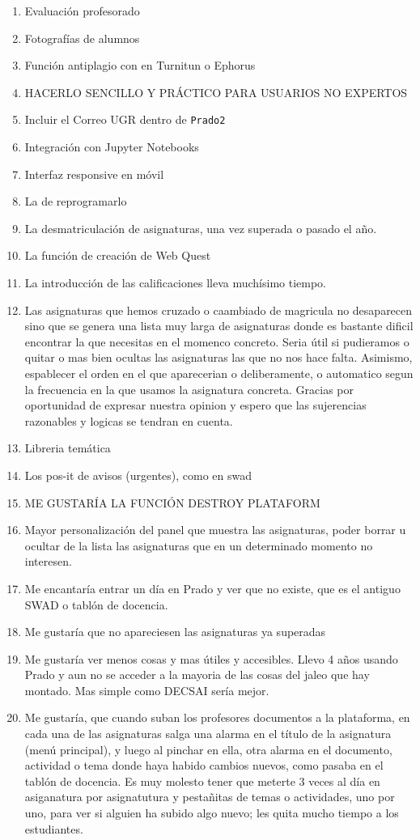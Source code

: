 \begin{enumerate}
\item Evaluación profesorado
\item Fotografías de alumnos
\item Función antiplagio con en Turnitun o Ephorus
\item HACERLO SENCILLO Y PRÁCTICO PARA USUARIOS NO EXPERTOS
\item Incluir el Correo UGR dentro de \texttt{Prado2}
\item Integración con Jupyter Notebooks
\item Interfaz responsive en móvil
\item La de reprogramarlo
\item La desmatriculación de asignaturas, una vez superada o pasado el año.
\item La función de creación de Web Quest
\item La introducción de las calificaciones lleva muchísimo tiempo.
\item Las asignaturas que hemos cruzado o caambiado de magricula no desaparecen sino que se genera una lista muy larga de asignaturas donde es bastante dificil encontrar la que necesitas en el momenco concreto. Seria útil si pudieramos o quitar o mas bien ocultas las asignaturas las que no nos hace falta. Asimismo, espablecer el orden en el que aparecerian o deliberamente, o automatico segun la frecuencia en la que usamos la asignatura concreta. Gracias por oportunidad de expresar nuestra opinion y espero que las sujerencias razonables y logicas se tendran en cuenta.
\item Libreria temática
\item Los pos-it de avisos (urgentes), como en swad
\item ME GUSTARÍA LA FUNCIÓN DESTROY PLATAFORM
\item Mayor personalización del panel que muestra las asignaturas, poder borrar u ocultar de la lista las asignaturas que en un determinado momento no interesen.
\item Me encantaría entrar un día en Prado y ver que no existe, que es el antiguo SWAD o tablón de docencia.
\item Me gustaría que no apareciesen las asignaturas ya superadas
\item Me gustaría ver menos cosas y mas útiles y accesibles. Llevo 4 años usando Prado y aun no se acceder a la mayoria de las cosas del jaleo que hay montado. Mas simple como DECSAI sería mejor.
\item Me gustaría, que cuando suban los profesores documentos a la plataforma, en cada una de las asignaturas salga una alarma en el título de la asignatura (menú principal), y luego al pinchar en ella, otra alarma en el documento, actividad o tema donde haya habido cambios nuevos, como pasaba en el tablón de docencia. Es muy molesto tener que meterte 3 veces al día en asiganatura por asignatutura y pestañitas de temas o actividades, uno por uno, para ver si alguien ha subido algo nuevo; les quita mucho tiempo a los estudiantes.

\end{enumerate}
